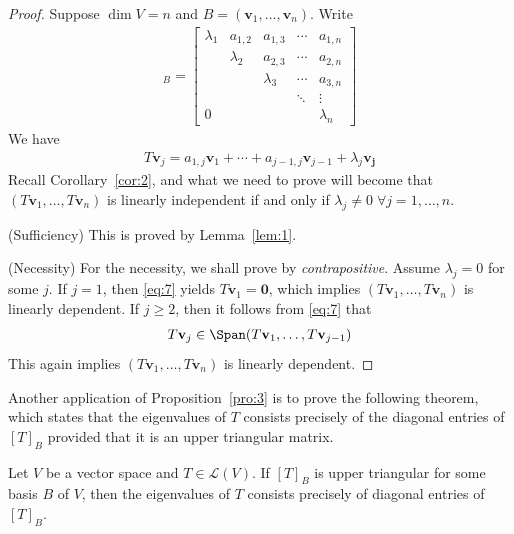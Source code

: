 \documentclass[thmcnt=section, color=blue, 12pt]{my-elegantbook}
\begin{document}
\begin{proof}
    Suppose $\dim V = n$ and $B = (\mathbf{v}_1, \ldots, \mathbf{v}_n)$. Write
    \begin{align*}
        [T]_B = \begin{bmatrix}
            \lambda_1 & a_{1,2} & a_{1,3} & \cdots & a_{1,n} \\ 
            & \lambda_2  & a_{2,3} &  \cdots & a_{2,n} \\ 
            & & \lambda_3 &  \cdots & a_{3, n} \\
            & & &  \ddots & \vdots\\
            0 & & & & \lambda_n
        \end{bmatrix}
    \end{align*}
    We have 
    \begin{align}
        T \mathbf{v}_j = a_{1,j} \mathbf{v}_1 + \cdots + a_{j-1, j} \mathbf{v}_{j-1} + \lambda_j \mathbf{v_j}
        \label{eq:7}
    \end{align}
    Recall Corollary~\ref{cor:2}, and what we need to prove will become that $(T \mathbf{v}_1, \ldots, T \mathbf{v}_n)$ is linearly independent if and only if $\lambda_j \neq 0 \; \forall j=1,\ldots,n$. 

    \par (Sufficiency) This is proved by Lemma~\ref{lem:1}.

    \par (Necessity) For the necessity, we shall prove by \textit{contrapositive}. Assume $\lambda_j = 0$ for some $j$. If $j = 1$, then \eqref{eq:7} yields $T \mathbf{v}_1 = \mathbf{0}$, which implies $(T \mathbf{v}_1, \ldots, T \mathbf{v}_n)$ is linearly dependent. If $j \geq 2$, then it follows from \eqref{eq:7} that 
    \begin{align*}
        T \mathbf{v}_j \in \Span(T\mathbf{v}_1, \ldots, T\mathbf{v}_{j-1})
    \end{align*}
    This again implies $(T \mathbf{v}_1, \ldots, T \mathbf{v}_n)$ is linearly dependent.
\end{proof}


\par Another application of Proposition~\ref{pro:3} is to prove the following theorem, which states that the eigenvalues of $T$ consists precisely of the diagonal entries of $[T]_B$ provided that it is an upper triangular matrix.

\begin{theorem}
    Let $V$ be a vector space and $T \in \mathcal{L}(V)$. If $[T]_B$ is upper triangular for some basis $B$ of $V$, then the eigenvalues of $T$ consists precisely of diagonal entries of $[T]_B$.
\end{theorem}
\end{document}
